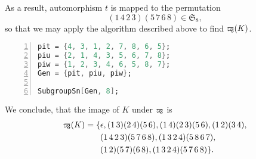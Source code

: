 As a result, automorphism $t$ is mapped to the permutation 
\begin{equation*}
(1\,4\,2\,3)(5\,7\,6\,8)\in\mathfrak{S}_8,
\end{equation*}
so that we may apply the algorithm described above to find $\varpi\hspace{-0.4em}_3(K)$.
\begin{lstlisting}[language=Mathematica, numbers=left, numberstyle=\tiny, stepnumber=2, numbersep=5pt]
pit = {4, 3, 1, 2, 7, 8, 6, 5};
piu = {2, 1, 4, 3, 5, 6, 7, 8};
piw = {1, 2, 3, 4, 6, 5, 8, 7};
Gen = {pit, piu, piw};

SubgroupSn[Gen, 8];
\end{lstlisting}
We conclude, that the image of $K$ under $\varpi\hspace{-0.4em}_3$ is
\begin{align*}
\varpi\hspace{-0.4em}_3(K)=\lbrace	&\epsilon,(1\, 3)(2\, 4)(5\, 6), (1\, 4)(2\, 3)(5\, 6), (1\, 2)(3\, 4),   \\
									&(1\, 4\, 2\, 3)(5\, 7\, 6\, 8), (1\, 3\, 2\, 4)(5\, 8\, 6\, 7), \\
									&(1\, 2)(5\, 7)(6\, 8),   (1\, 3\, 2\, 4)(5\, 7\, 6\, 8)\rbrace.
\end{align*}